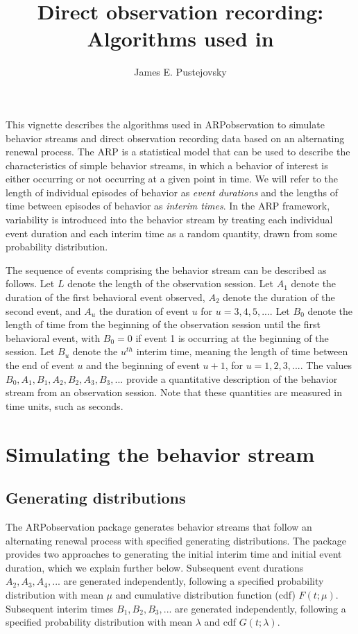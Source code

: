 \documentclass{article}\usepackage[]{graphicx}\usepackage[]{color}
\author{James E. Pustejovsky}
\title{Direct observation recording: Algorithms used in \pkg{ARPobservation}}
\newcommand{\pkg}[1]{{\fontseries{b}\selectfont #1}}
\begin{document}
\maketitle

This vignette describes the algorithms used in \pkg{ARPobservation} to simulate behavior streams and direct observation recording data based on an alternating renewal process. The ARP is a statistical model that can be used to describe the characteristics of simple behavior streams, in which a behavior of interest is either occurring or not occurring at a given point in time. We will refer to the length of individual episodes of behavior as \textit{event durations} and the lengths of time between episodes of behavior as \textit{interim times}. In the ARP framework, variability is introduced into the behavior stream by treating each individual event duration and each interim time as a random quantity, drawn from some probability distribution. 

The sequence of events comprising the behavior stream can be described as follows. Let $L$ denote the length of the observation session. Let $A_1$ denote the duration of the first behavioral event observed, $A_2$ denote the duration of the second event, and $A_u$ the duration of event $u$ for $u = 3,4,5,...$. Let $B_0$ denote the length of time from the beginning of the observation session until the first behavioral event, with $B_0 = 0$ if event 1 is occurring at the beginning of the session. Let $B_u$ denote the $u^{th}$ interim time, meaning the length of time between the end of event $u$ and the beginning of event $u + 1$, for $u = 1,2,3,...$. The values $B_0,A_1,B_1,A_2,B_2,A_3,B_3,...$ provide a quantitative description of the behavior stream from an observation session. Note that these quantities are measured in time units, such as seconds. 

\section{Simulating the behavior stream}

\subsection{Generating distributions} 

The \pkg{ARPobservation} package generates behavior streams that follow an alternating renewal process with specified generating distributions. The package provides two approaches to generating the initial interim time and initial event duration, which we explain further below. Subsequent event durations $A_2,A_3,A_4,...$ are generated independently, following a specified probability distribution with mean $\mu$ and cumulative distribution function (cdf) $F(t; \mu)$. Subsequent interim times $B_1,B_2,B_3,...$ are generated independently, following a specified probability distribution with mean $\lambda$ and cdf $G(t; \lambda)$. 
\end{document}
